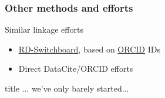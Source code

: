 \begin{frame}
	\frametitle{Other methods and efforts}
	\begin{block}{Similar linkage efforts}
		\begin{itemize}
			\item \href{http://www.rd-switchboard.org/}{RD-Switchboard}, based on \href{https://orcid.org/}{ORCID} IDs
			\item Direct DataCite/ORCID efforts
		\end{itemize}
	\end{block}
\end{frame}

\begin{frame}
\begin{beamercolorbox}[sep=8pt,center]{title}
	... we've only barely started...
\end{beamercolorbox}
\end{frame}

